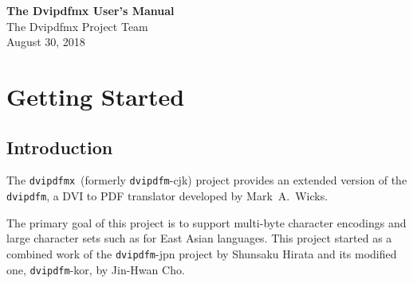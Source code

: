 \documentclass[a4paper,xetex,oneside]{book}
\newcommand{\dvipdfm}{\texttt{dvipdfm}}
\newcommand{\dvipdfmx}{\texttt{dvipdfmx}}
\begin{document}
\begin{titlepage}
  \begin{raggedleft}
    {\Huge\bfseries The Dvipdfmx User's Manual}\\[\baselineskip]
    \Large The Dvipdfmx Project Team\\
    August 30, 2018\par
  \end{raggedleft}
\end{titlepage}

\tableofcontents

\chapter{Getting Started}

\section{Introduction}

The \dvipdfmx\ (formerly \dvipdfm-cjk) project provides an extended version of
the \dvipdfm, a DVI to PDF translator developed by Mark~A.~Wicks.

The primary goal of this project is to support multi-byte character encodings
and large character sets such as for East Asian languages.
This project started as a combined work of the \dvipdfm-jpn project by
Shunsaku Hirata and its modified one, \dvipdfm-kor, by Jin-Hwan Cho.
\end{document}
